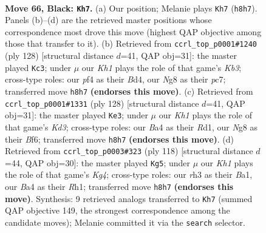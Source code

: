 \documentclass[11pt]{article}
\begin{document}
\clearpage

\begin{figure}[p]\centering
\begin{subfigure}{0.46\textwidth}\centering
\resizebox{\linewidth}{!}{%
\newchessgame
\chessboard[
  setfen={1R4nk/p7/P6p/1P3p2/b4P2/7R/3r4/4b1K1 b - - 2 66},
  showmover=false,
  pgfstyle=straightmove, color=movearrow, markmove={h8-h7}
]}
\caption{}
\end{subfigure}\hfill
\begin{subfigure}{0.46\textwidth}\centering
\resizebox{\linewidth}{!}{%
\newchessgame
\chessboard[
  setfen={2k5/2p2R2/p3r3/P7/2PB4/1K1bP3/8/8 w - - 27 65},
  showmover=false,
  pgfstyle=straightmove, color=movearrow, markmove={b3-c3}
]}
\caption{}
\end{subfigure}
\\[4pt]
\begin{subfigure}{0.46\textwidth}\centering
\resizebox{\linewidth}{!}{%
\newchessgame
\chessboard[
  setfen={4k3/7p/2r2BpP/6P1/1r6/3K4/B2p4/3R4 w - - 7 65},
  showmover=false,
  pgfstyle=straightmove, color=movearrow, markmove={d3-e3}
]}
\caption{}
\end{subfigure}\hfill
\begin{subfigure}{0.46\textwidth}\centering
\resizebox{\linewidth}{!}{%
\newchessgame
\chessboard[
  setfen={8/7r/4p2P/p3P3/1pkp2K1/8/2P5/B6R w - - 0 60},
  showmover=false,
  pgfstyle=straightmove, color=movearrow, markmove={g4-g5}
]}
\caption{}
\end{subfigure}
\caption{\textbf{Move 66, Black: \texttt{Kh7}.} (a) Our position; Melanie plays \texttt{Kh7} (\texttt{h8h7}). Panels (b)--(d) are the retrieved master positions whose correspondence most drove this move (highest QAP objective among those that transfer to it). (b) Retrieved from \texttt{ccrl\_top\_p0001\#1240} (ply 128) [structural distance $d$=41, QAP obj=31]: the master played \texttt{Kc3}; under $\mu$ our \emph{Kh1} plays the role of that game's \emph{Kb3}; cross-type roles: our \emph{p}f4 as their \emph{B}d4, our \emph{N}g8 as their \emph{p}c7; transferred move \texttt{h8h7} \textbf{(endorses this move)}. (c) Retrieved from \texttt{ccrl\_top\_p0001\#1331} (ply 128) [structural distance $d$=41, QAP obj=31]: the master played \texttt{Ke3}; under $\mu$ our \emph{Kh1} plays the role of that game's \emph{Kd3}; cross-type roles: our \emph{B}a4 as their \emph{R}d1, our \emph{N}g8 as their \emph{B}f6; transferred move \texttt{h8h7} \textbf{(endorses this move)}. (d) Retrieved from \texttt{ccrl\_top\_p0003\#323} (ply 118) [structural distance $d$=44, QAP obj=30]: the master played \texttt{Kg5}; under $\mu$ our \emph{Kh1} plays the role of that game's \emph{Kg4}; cross-type roles: our \emph{r}h3 as their \emph{B}a1, our \emph{B}a4 as their \emph{R}h1; transferred move \texttt{h8h7} \textbf{(endorses this move)}. Synthesis: 9 retrieved analogs transferred to \texttt{Kh7} (summed QAP objective 149, the strongest correspondence among the candidate moves); Melanie committed it via the \texttt{search} selector.}
\label{fig:thought-m131}
\end{figure}
\end{document}
